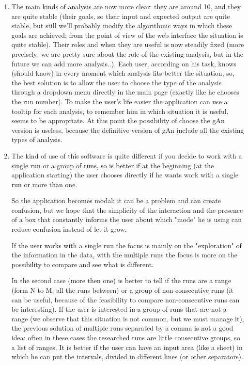 \begin{enumerate}
\item 
The main kinds of analysis are now more clear: they are around 10, and they are     quite stable (their goals, so their input and expected output are quite stable, but still we'll probably modify the algorithmic ways in which these goals are achieved; from the point of view of the web interface the situation is quite stable). Their roles and when they are useful is now steadily fixed (more precisely: we are pretty sure about the role of the existing analysis, but in the future we can add more analysis..). Each user, according on his task, knows (should know) in every moment which analysis fits better the situation, so, the best solution is to allow the user to choose the type of the analysis through a dropdown menu directly in the main page (exactly like he chooses the run number). To make the user's life easier the application can use a tooltip for each analysis, to remember him in which situation it is useful, seems to be appropriate. At this point the possibility of choose the gAn version is useless, because the definitive version of gAn include all the existing types of analysis. 

\item 
The kind of use of this software is quite different if you decide to work with a single run or a group of runs, so is better if at the beginning (at the application starting) the user chooses directly if he wants work with a single run or more than one. 

So the application becomes modal: it can be a problem and can create confusion, but we hope that the simplicity of the interaction and the presence of a box that constantly informs the user about which "mode" he is using can reduce confusion instead of let it grow.  

If the user works with a single run the focus is mainly on the "exploration" of the information in the data, with the multiple runs the focus is more on the possibility to compare and see what is different.

In the second case (more then one) is better to tell if the runs are a range (form N to M, all the runs between) or a group of non-consecutive runs (it can be useful, because of the feasibility to compare non-consecutive runs can be interesting). If the user is interested in a group of runs that are not a range (we observe that this situation is not common, but we must manage it), the previous solution of multiple runs separated by a comma is not a good idea: often in these cases the researched runs are little consecutive groups, so a list of ranges. It is better if the user can have an input area (like a sheet) in which he can put the intervals, divided in different lines (or other separators).


\end{enumerate}
